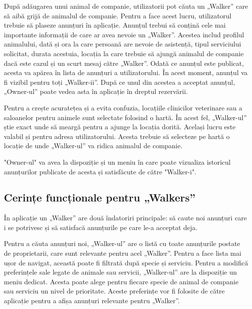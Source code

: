 După adăugarea unui animal de companie, utilizatorii pot căuta un „Walker” care să aibă grijă de animalul de companie. Pentru a face acest lucru, utilizatorul trebuie să plaseze anunțuri în aplicație. Anunțul trebui să conțină cele mai importante informații de care ar avea nevoie un „Walker”. Acestea includ profilul animalului, dată și ora la care persoană are nevoie de asistență, tipul serviciului solicitat, durata acestuia, locația la care trebuie să ajungă animalul de companie dacă este cazul și un scurt mesaj către „Walker”. Odată ce anunțul este publicat, acesta va apărea în lista de anunțuri a utilizatorului. În acest moment, anunțul va fi vizibil pentru toți „Walker-ii”. După ce unul din acestea a acceptat anunțul, „Owner-ul” poate vedea asta în aplicație în dreptul rezervării.

Pentru a crește acuratețea și a evita confuzia, locațiile clinicilor veterinare sau a saloanelor pentru animele sunt selectate folosind o hartă. În acest fel, „Walker-ul” știe exact unde să meargă pentru a ajunge la locația dorită. Același lucru este valabil și pentru adresa utilizatorului. Acesta trebuie să selecteze pe hartă o locație de unde „Walker-ul” va ridica animalul de companie.

"Owner-ul" va avea la dispoziție și un meniu în care poate vizualiza istoricul anunțurilor publicate de acesta și satisfăcute de către "Walker-i".

\subsection{Cerințe funcționale pentru „Walkers”}

În aplicație un „Walker” are două îndatoriri principale: să caute noi anunțuri care i se potrivesc și să satisfacă anunțurile pe care le-a acceptat deja.

Pentru a căuta anunțuri noi, „Walker-ul” are o listă cu toate anunțurile postate de proprietarii, care sunt relevante pentru acel „Walker”. Pentru a face lista mai ușor de navigat, această poate fi filtrată după specie și serviciu. Pentru a modifică preferințele sale legate de animale sau servicii, „Walker-ul” are la dispoziție un meniu dedicat. Acesta poate alege pentru fiecare specie de animal de companie sau serviciu un nivel de prioritate. Aceste preferințe vor fi folosite de către aplicație pentru a afișa anunțuri relevante pentru „Walker”.

